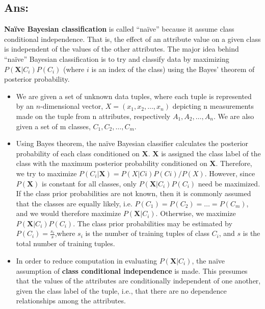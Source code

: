 \subsection*{Ans:}

\textbf{Naïve Bayesian classification} is called ``naïve'' because it assume class conditional
independence. That is, the effect of an attribute value on a given class is independent of 
the values of the other attributes. The major idea behind ``naïve'' Bayesian classification is to 
try and classify data by maximizing $P(\textbf{X} \vert C_{i})P(C_{i})$ (where $i$ is an index of the class)
using the Bayes' theorem of posterior probability.

\begin{itemize}

	\item We are given a set of unknown data tuples, where each tuple is represented by 
	an $n$-dimensional vector, $X = (x_{1}, x_{2}, \ldots, x_{n})$ depicting n measurements 
	made on the tuple from n attributes, respectively $A_{1}, A_{2}, \ldots, A_{n}$. We are also given 
	a set of m classes, $C_{1}, C_{2}, \ldots, C_{m}$.

	\item Using Bayes theorem, the naïve Bayesian classifier calculates the posterior 
	probability of each class conditioned on $\textbf{X}$. $\textbf{X}$ is assigned 
	the class label of the class with the maximum posterior probability conditioned on 
	$\textbf{X}$. Therefore, we try to maximize $P(C_{i} \vert \textbf{X}) = P(X|Ci)P(Ci)/P(X)$.
	However, since $P(\textbf{X})$ is constant for all classes, only $P(\textbf{X} \vert C_{i})
	P(C_{i})$ need be maximized. If the class prior probabilities are not known, 
	then it is commonly assumed that the classes are equally likely, i.e. 
	$P(C_{1}) = P(C_{2}) = \ldots = P(C_{m})$, and we would therefore maximize $P(\textbf{X} \vert C_{i})$.
	Otherwise, we maximize $P(\textbf{X} \vert C_{i})P(C_{i})$. The class prior probabilities may be estimated by 
	$P(C_{i}) = \frac{s_{i}}{s}$,where $s_{i}$ is the number of training tuples of class $C_{i}$, 
	and $s$ is the total number of training tuples.

	\item In order to reduce computation in evaluating $P(\textbf{X} \vert C_{i})$,
	the naïve assumption of \textbf{class conditional independence} is made.
	This presumes that the values of the attributes are conditionally
	independent of one another, given the class label of the tuple, i.e., 
	that there are no dependence relationships among the attributes.


\end{itemize}
